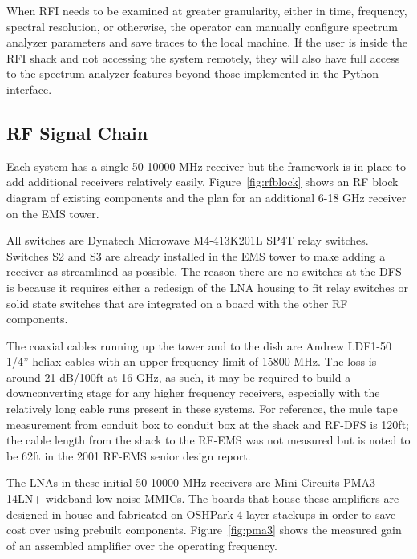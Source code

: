 \documentclass[titlepage]{article}
\begin{document}
When RFI needs to be examined at greater granularity, either in time, frequency, spectral resolution, or otherwise, the operator can manually configure spectrum analyzer parameters and save traces to the local machine. If the user is inside the RFI shack and not accessing the system remotely, they will also have full access to the spectrum analyzer features beyond those implemented in the Python interface.

\subsection{RF Signal Chain}\label{sec:rfchain}
Each system has a single 50-10000 MHz receiver but the framework is in place to add additional receivers relatively easily. Figure~\ref{fig:rfblock} shows an RF block diagram of existing components and the plan for an additional 6-18 GHz receiver on the EMS tower.

All switches are Dynatech Microwave M4-413K201L SP4T relay switches. Switches S2 and S3 are already installed in the EMS tower to make adding a receiver as streamlined as possible. The reason there are no switches at the DFS is because it requires either a redesign of the LNA housing to fit relay switches or solid state switches that are integrated on a board with the other RF components.

The coaxial cables running up the tower and to the dish are Andrew LDF1-50 1/4'' heliax cables with an upper frequency limit of 15800 MHz. The loss is around 21 dB/100ft at 16 GHz, as such, it may be required to build a downconverting stage for any higher frequency receivers, especially with the relatively long cable runs present in these systems. For reference, the mule tape measurement from conduit box to conduit box at the shack and RF-DFS is 120ft; the cable length from the shack to the RF-EMS was not measured but is noted to be 62ft in the 2001 RF-EMS senior design report.

The LNAs in these initial 50-10000 MHz receivers are Mini-Circuits PMA3-14LN+ wideband low noise MMICs. The boards that house these amplifiers are designed in house and fabricated on OSHPark 4-layer stackups in order to save cost over using prebuilt components. Figure~\ref{fig:pma3} shows the measured gain of an assembled amplifier over the operating frequency.
\end{document}
